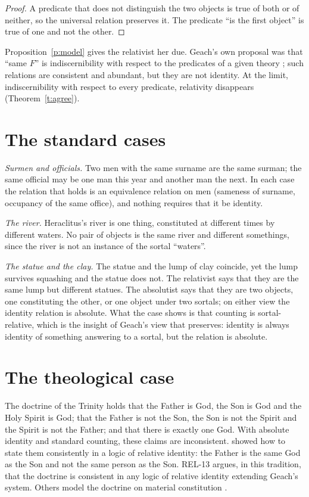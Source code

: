 \documentclass{situationist-preprint}
\begin{document}
\begin{proof}
A predicate that does not distinguish the two objects is true of both or of neither, so the universal relation preserves it. The predicate \enquote{is the first object} is true of one and not the other.
\end{proof}

Proposition~\ref{p:model} gives the relativist her due. Geach's own proposal was that \enquote{same $F$} is indiscernibility with respect to the predicates of a given theory \citep{Geach1967}; such relations are consistent and abundant, but they are not identity. At the limit, indiscernibility with respect to every predicate, relativity disappears (Theorem~\ref{t:agree}).

\section{The standard cases}

\emph{Surmen and officials.} Two men with the same surname are the same surman; the same official may be one man this year and another man the next. In each case the relation that holds is an equivalence relation on men (sameness of surname, occupancy of the same office), and nothing requires that it be identity.

\emph{The river.} Heraclitus's river is one thing, constituted at different times by different waters. No pair of objects is the same river and different somethings, since the river is not an instance of the sortal \enquote{waters}.

\emph{The statue and the clay.} The statue and the lump of clay coincide, yet the lump survives squashing and the statue does not. The relativist says that they are the same lump but different statues. The absolutist says that they are two objects, one constituting the other, or one object under two sortals; on either view the identity relation is absolute. What the case shows is that counting is sortal-relative, which is the insight of Geach's view that \citet{Wiggins2001} preserves: identity is always identity of something answering to a sortal, but the relation is absolute.

\section{The theological case}

The doctrine of the Trinity holds that the Father is God, the Son is God and the Holy Spirit is God; that the Father is not the Son, the Son is not the Spirit and the Spirit is not the Father; and that there is exactly one God. With absolute identity and standard counting, these claims are inconsistent. \citet{vanInwagen1988} showed how to state them consistently in a logic of relative identity: the Father is the same God as the Son and not the same person as the Son. REL-13 argues, in this tradition, that the doctrine is consistent in any logic of relative identity extending Geach's system. Others model the doctrine on material constitution \citep{BrowerRea2005}.
\end{document}
